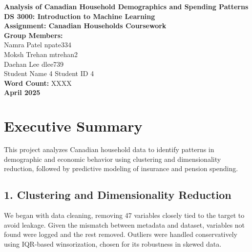\documentclass{article}
\begin{document}
\begin{titlepage}
    \centering
    \vspace*{2cm}
    
    \Huge
    \textbf{Analysis of Canadian Household Demographics and Spending Patterns}\\[1.5cm]
    
    \Large
    \textbf{DS 3000: Introduction to Machine Learning}\\[0.5cm]
    \textbf{Assignment: Canadian Households Coursework}\\[0.5cm]
    
    \vspace{1.5cm}
    \Large
    \textbf{Group Members:}\\[0.5cm]
    \normalsize
    Namra Patel \hfill npate334 \\[0.2cm]
    Moksh Trehan \hfill mtrehan2\\[0.2cm]
    Daehan Lee \hfill dlee739 \\[0.2cm]
    Student Name 4 \hfill Student ID 4\\[1.5cm]
    
    \Large
    \textbf{Word Count:} XXXX\\[2cm] 
    
    \vfill
    \Large
    \textbf{April 2025}
    
\end{titlepage}


\tableofcontents
\newpage	

\section*{Executive Summary}

This project analyzes Canadian household data to identify patterns in demographic and economic behavior using clustering and dimensionality reduction, followed by predictive modeling of insurance and pension spending.

\subsection*{1. Clustering and Dimensionality Reduction}

We began with data cleaning, removing 47 variables closely tied to the target to avoid leakage. Given the mismatch between metadata and dataset, variables not found were logged and the rest removed. Outliers were handled conservatively using IQR-based winsorization, chosen for its robustness in skewed data.
\end{document}
